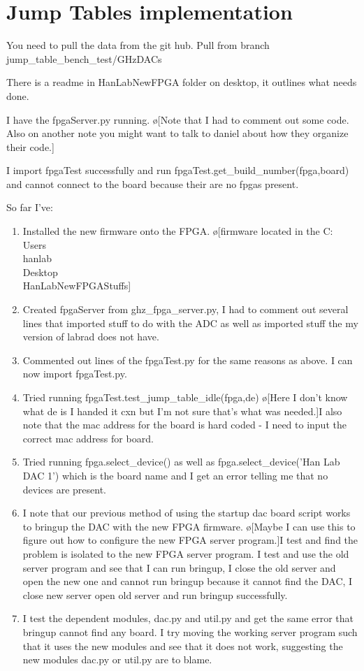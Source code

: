 \documentclass[10pt]{book}
\begin{document}
{\section{Jump Tables implementation}
You need to pull the data from the git hub. Pull from branch jump\_table\_bench\_test/GHzDACs

There is a readme in HanLabNewFPGA folder on desktop, it outlines what needs done.

I have the fpgaServer.py running. \o[Note that I had to comment out some code. Also on another note you might want to talk to daniel about how they organize their code.]{}

I import fpgaTest successfully and run fpgaTest.get\_build\_number(fpga,board) and cannot connect to the board because their are no fpgas present.

So far I've:
\begin{enumerate}
    \item Installed the new firmware onto the FPGA. \o[firmware located in the C:\\Users\\hanlab\\Desktop\\HanLabNewFPGAStuffs]{}
    \item Created fpgaServer from ghz\_fpga\_server.py, I had to comment out several lines that imported stuff to do with the ADC as well as imported stuff the my version of labrad does not have.
    \item Commented out lines of the fpgaTest.py for the same reasons as above. I can now import fpgaTest.py.
    \item Tried running fpgaTest.test\_jump\_table\_idle(fpga,de) \o[Here I don't know what de is I handed it cxn but I'm not sure that's what was needed.]{I also note that the mac address for the board is hard coded - I need to input the correct mac address for board.}
    \item Tried running fpga.select\_device() as well as fpga.select\_device('Han Lab DAC 1') which is the board name and I get an error telling me that no devices are present.
    \item I note that our previous method of using the startup dac board script works to bringup the DAC with the new FPGA firmware. \o[Maybe I can use this to figure out how to configure the new FPGA server program.]{I test and find the problem is isolated to the new FPGA server program. I test and use the old server program and see that I can run bringup, I close the old server and open the new one and cannot run bringup because it cannot find the DAC, I close new server open old server and run bringup successfully.}
    \item I test the dependent modules, dac.py and util.py and get the same error that bringup cannot find any board. I try moving the working server program such that it uses the new modules and see that it does not work, suggesting the new modules dac.py or util.py are to blame.
\end{enumerate}


}
\end{document}
